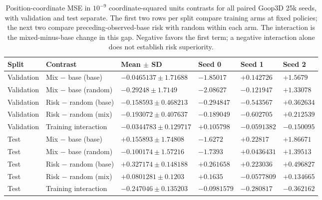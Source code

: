\begin{table}[p]
\centering\scriptsize
\caption{Position-coordinate MSE in $10^{-9}$ coordinate-squared units contrasts for all paired Goop3D 25k seeds, with validation and test separate. The first two rows per split compare training arms at fixed policies; the next two compare preceding-observed-base risk with random within each arm. The interaction is the mixed-minus-base change in this gap. Negative favors the first term; a negative interaction alone does not establish risk superiority.}
\label{tab:goop3d25k-observed-position-contrasts}
\setlength{\tabcolsep}{3pt}
\begin{tabular}{llllll}
\toprule
Split & Contrast & Mean $\pm$ SD & Seed 0 & Seed 1 & Seed 2\\
\midrule
Validation & Mix $-$ base (base) & $-0.0465137\pm1.71688$ & $-1.85017$ & $+0.142726$ & $+1.5679$\\
Validation & Mix $-$ base (random) & $-0.29248\pm1.7149$ & $-2.08627$ & $-0.121947$ & $+1.33078$\\
Validation & Risk $-$ random (base) & $-0.158593\pm0.468213$ & $-0.294847$ & $-0.543567$ & $+0.362634$\\
Validation & Risk $-$ random (mix) & $-0.193072\pm0.407637$ & $-0.189049$ & $-0.602705$ & $+0.212539$\\
Validation & Training interaction & $-0.0344783\pm0.129717$ & $+0.105798$ & $-0.0591382$ & $-0.150095$\\
Test & Mix $-$ base (base) & $+0.155893\pm1.74808$ & $-1.6272$ & $+0.22817$ & $+1.86671$\\
Test & Mix $-$ base (random) & $-0.100174\pm1.57216$ & $-1.7393$ & $+0.0436431$ & $+1.39513$\\
Test & Risk $-$ random (base) & $+0.327174\pm0.148188$ & $+0.261658$ & $+0.223036$ & $+0.496827$\\
Test & Risk $-$ random (mix) & $+0.0801281\pm0.1203$ & $+0.1635$ & $-0.0577809$ & $+0.134665$\\
Test & Training interaction & $-0.247046\pm0.135203$ & $-0.0981579$ & $-0.280817$ & $-0.362162$\\
\bottomrule
\end{tabular}
\end{table}

